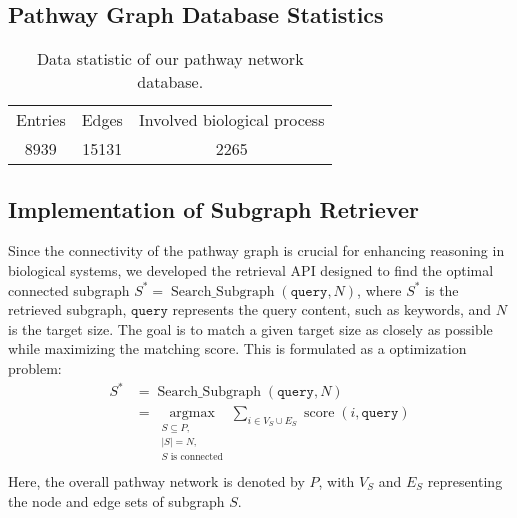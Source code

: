 \subsection{Pathway Graph Database Statistics} \label{appendix pathway statistic}

\begin{table}[!h]
\centering
\caption{Data statistic of our pathway network database.}
\label{table pathway statistic}
\begin{tabular}{ccc}
\toprule
Entries & Edges & Involved biological process \\
8939    & 15131 & 2265                        \\
\bottomrule
\end{tabular}
\end{table}

\subsection{Implementation of Subgraph Retriever} \label{appendix subgraph retriever}

Since the connectivity of the pathway graph is crucial for enhancing reasoning in biological systems, we developed the retrieval API designed to find the optimal connected subgraph $S^*=\operatorname{Search\_Subgraph}(\texttt{query}, N)$, where $S^*$ is the retrieved subgraph, $\texttt{query}$ represents the query content, such as keywords, and $N$ is the target size. The goal is to match a given target size as closely as possible while maximizing the matching score. This is formulated as a optimization problem:
\begin{equation}
\begin{aligned}
S^*&=\operatorname{Search\_Subgraph}(\texttt{query}, N)\\&= \underset{\substack{S \subseteq P, \\ |S|=N,\\S \text { is connected}}}{\operatorname{argmax}} \sum_{i \in V_S \cup E_S} \operatorname{score}(i, \texttt{query})\\
\end{aligned}
\end{equation}
Here, the overall pathway network is denoted by $P$, with $V_S$ and $E_S$ representing the node and edge sets of subgraph $S$. 



